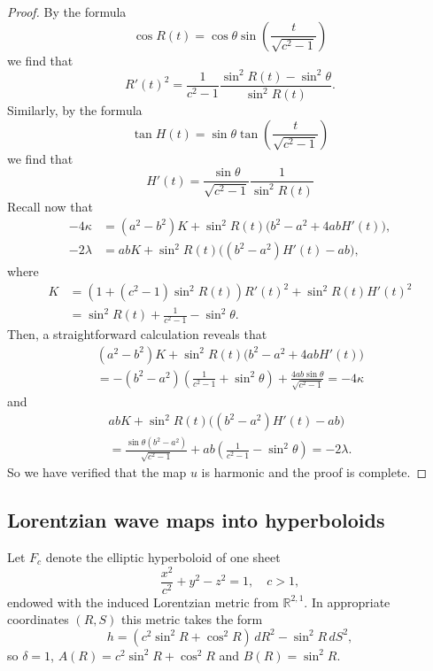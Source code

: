 \documentclass[12pt]{amsart}
\begin{document}
\begin{proof}
		By the formula 
		\[
		\cos{R(t)}=\cos\theta\sin\left(\frac{t}{\sqrt{c^2-1}}\right)
		\]
		we find that 
		\[
		R'(t)^2 =\frac{1}{c^2-1}\frac{\sin^2{R(t)}-\sin^2{\theta}}{\sin^2{R(t)}}.
		\]
		Similarly, by the formula
		\[
		\tan{H(t)}=\sin{\theta}
		\tan
		\left(\frac{t}{\sqrt{c^2-1}}
		\right)
		\]
		we find that
		\[
		H'(t)=\frac{\sin{\theta}}{\sqrt{c^2-1}}\frac{1}{\sin^2{R(t)}}
		\]
		Recall now that 
		\begin{align*}
			- 4\kappa
			&=
			(a^{2}-b^{2})K
			+ \sin^2{R(t)}\big(b^{2}-a^{2}+4abH'(t)\big),\\[0.3em]
			-2\lambda
			&=
			abK
			+\sin^2{R(t)}\big( (b^{2}-a^{2})H'(t) - ab\big),
		\end{align*}
		where
		\begin{align*}
			K &= (1+(c^2-1)\sin^2{R(t)}) R'(t)^{2}+\sin^2{R(t)} H'(t)^{2}\\
			&=\sin^2{R(t)} + \frac{1}{c^2-1} - \sin^2\theta.
		\end{align*}
		Then, a straightforward calculation reveals that
		\begin{align*}
			(a^{2}-b^{2})K+\sin^2{R(t)}\big(b^{2}-a^{2}+4abH'(t)\big)
			\\=-(b^2 - a^2)
			\left(\frac{1}{c^2 - 1} + \sin^2\theta\right) +
			\frac{4ab\sin\theta}{\sqrt{c^2 - 1}} =-4\kappa
		\end{align*}
		and 
		\begin{align*}
			abK+  \sin^2{R(t)}\big( (b^{2}-a^{2})H'(t) - ab\big)
			\\=\frac{\sin\theta(b^2 - a^2)}{\sqrt{c^2 - 1}}
			+ab\left(\frac{1}{c^2 - 1} - \sin^2\theta\right)=-2\lambda.
		\end{align*}
		So we have verified that the map $u$ is harmonic and the proof is complete.
	\end{proof}

\subsection{Lorentzian wave maps into hyperboloids}

Let $F_c$ denote the elliptic hyperboloid of one sheet
\[
\frac{x^2}{c^2} + y^2 - z^2 = 1, \quad c > 1,
\]
endowed with the induced Lorentzian metric from
$\mathbb{R}^{2,1}$. In appropriate coordinates $(R,S)$ this metric
takes the form
\[
h = (c^2\sin^2 R + \cos^2 R)\,dR^2 - \sin^2 R\,dS^2,
\]
so $\delta = 1$, $A(R) = c^2\sin^2 R + \cos^2 R$ and $B(R) = \sin^2 R$.
\end{document}
